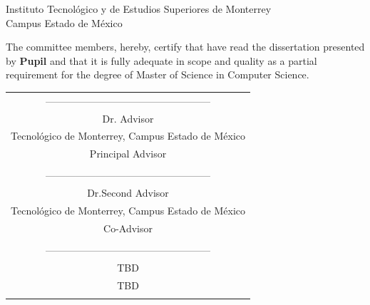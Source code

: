 \documentclass[11pt, a4paper, oneside]{Thesis} %
\begin{document}
\clearpage
\begin{center}

    \Large {Instituto Tecnológico y de Estudios Superiores de Monterrey\\}
    \normalsize {Campus Estado de México}

    The committee members, hereby, certify that have read the dissertation presented by {\bf Pupil} and that it is fully adequate in scope and quality as a partial requirement for the degree of  Master of Science in Computer Science.
    \vspace*{.8 cm}

    \begin{table}[hbtp]
        \begin{flushright}
            \begin{tabular}{c}
                {--------------------------------------------------}
                \\
                Dr. Advisor                        \\
                Tecnológico de Monterrey, Campus Estado de México    \\
                Principal Advisor                                    \\
                \vspace*{.6 cm}                                      \\
                {--------------------------------------------------} \\
                Dr.Second Advisor                            \\
                Tecnológico de Monterrey, Campus Estado de México    \\
                Co-Advisor                                           \\
                \vspace*{.6 cm}                                      \\
                {--------------------------------------------------} \\
                TBD                                                  \\
                TBD                                                  \\
                \vspace*{.6 cm}                                      \\

\end{tabular}
\end{flushright}
\end{table}
\end{center}
\end{document}
